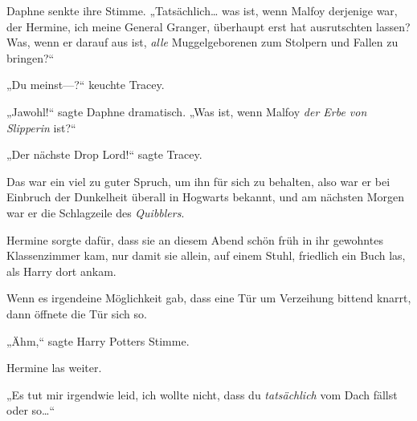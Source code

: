 Daphne senkte ihre Stimme. „Tatsächlich… was ist, wenn Malfoy derjenige war, der Hermine, ich meine General Granger, überhaupt erst hat ausrutschten lassen? Was, wenn er darauf aus ist, \emph{alle} Muggelgeborenen zum Stolpern und Fallen zu bringen?“

„Du meinst—?“ keuchte Tracey.

„Jawohl!“ sagte Daphne dramatisch. „Was ist, wenn Malfoy \emph{der Erbe von} \emph{Slipperin} ist?“%

„Der nächste Drop Lord!“%
sagte Tracey.

Das war ein viel zu guter Spruch, um ihn für sich zu behalten, also war er bei Einbruch der Dunkelheit überall in Hogwarts bekannt, und am nächsten Morgen war er die Schlagzeile des \emph{Quibblers}.


Hermine sorgte dafür, dass sie an diesem Abend schön früh in ihr gewohntes Klassenzimmer kam, nur damit sie allein, auf einem Stuhl, friedlich ein Buch las, als Harry dort ankam.

Wenn es irgendeine Möglichkeit gab, dass eine Tür um Verzeihung bittend knarrt, dann öffnete die Tür sich so.

„Ähm,“ sagte Harry Potters Stimme.

Hermine las weiter.

„Es tut mir irgendwie leid, ich wollte nicht, dass du \emph{tatsächlich} vom Dach fällst oder so…“

